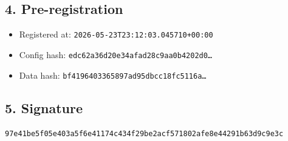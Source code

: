 \documentclass{article}
\begin{document}
\subsection*{4. Pre-registration}
\begin{itemize}
\item Registered at: \texttt{2026-05-23T23:12:03.045710+00:00}
\item Config hash: \texttt{edc62a36d20e34afad28c9aa0b4202d0\dots}
\item Data hash: \texttt{bf4196403365897ad95dbcc18fc5116a\dots}
\end{itemize}
\subsection*{5. Signature}
\texttt{97e41be5f05e403a5f6e41174c434f29be2acf571802afe8e44291b63d9c9e3c}\\
\end{document}
